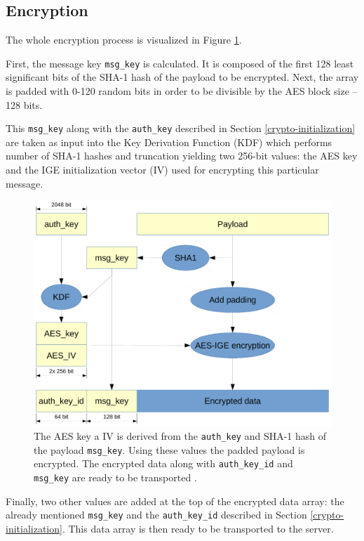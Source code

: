 \documentclass[thesis=M,english]{FITthesis}[2012/10/20]
\begin{document}
\subsection{Encryption}\label{crypto-regular-enc}

The whole encryption process is visualized in Figure \ref{img:crypto-regular-enc}.

First, the message key \texttt{msg\_key} is calculated. It is composed of the first 128 least significant bits of the SHA-1 hash of the payload to be encrypted. Next, the array is padded with 0-120 random bits in order to be divisible by the AES block size -- 128 bits.

This \texttt{msg\_key} along with the \texttt{auth\_key} described in Section \ref{crypto-initialization} are taken as input into the Key Derivation Function (KDF) which performs number of SHA-1 hashes and truncation yielding two 256-bit values: the AES key and the IGE initialization vector (IV) used for encrypting this particular message.

\begin{figure}[htb]
	\centering
	\includegraphics[width=1\textwidth]{mtproto-encflow.pdf}
	\caption{The AES key a IV is derived from the \texttt{auth\_key} and SHA-1 hash of the payload \texttt{msg\_key}. Using these values the padded payload is encrypted. The encrypted data along with \texttt{auth\_key\_id} and \texttt{msg\_key} are ready to be transported \cite{telegram-aarhus}.}
	\label{img:crypto-regular-enc}
\end{figure}

Finally, two other values are added at the top of the encrypted data array: the already mentioned \texttt{msg\_key} and the \texttt{auth\_key\_id} described in Section \ref{crypto-initialization}. This data array is then ready to be transported to the server.
\end{document}
